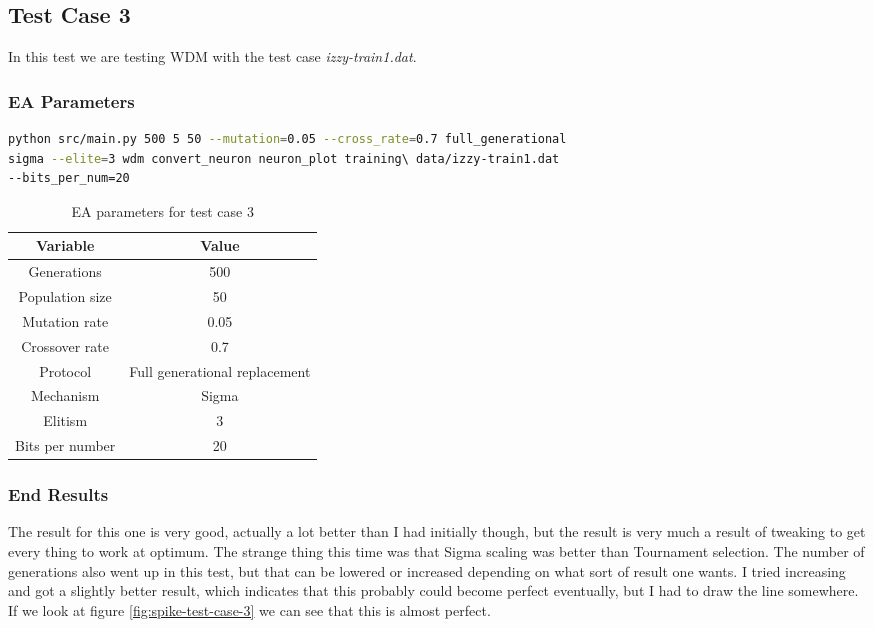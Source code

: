\subsection{Test Case 3}\label{sec:test-case-3}
In this test we are testing WDM with the test case
\textit{izzy-train1.dat}.
\subsubsection{EA Parameters}\label{sec:test-case-3-parameters}
\begin{lstlisting}[frame=single, language=bash, caption=Command-line to
replicate the results]
python src/main.py 500 5 50 --mutation=0.05 --cross_rate=0.7 full_generational
sigma --elite=3 wdm convert_neuron neuron_plot training\ data/izzy-train1.dat
--bits_per_num=20
\end{lstlisting}
\begin{table}
	\begin{tabular}{c c}
		Variable & Value \\
		\hline
		Generations & 500 \\
		\hline
		Population size & 50 \\
		\hline
		Mutation rate & 0.05 \\
		\hline
		Crossover rate & 0.7 \\
		\hline
		Protocol & Full generational replacement \\
		\hline
		Mechanism & Sigma \\
		\hline
		Elitism & 3 \\
		\hline
		Bits per number & 20 \\
	\end{tabular}
	\caption{EA parameters for test case 3}
\end{table}
\subsubsection{End Results}\label{sec:test-case-3-results}
The result for this one is very good, actually a lot better than I had initially
though, but the result is very much a result of tweaking to get every thing to
work at optimum. The strange thing this time was that Sigma scaling was better
than Tournament selection. The number of generations also went up in this test,
but that can be lowered or increased depending on what sort of result one wants.
I tried increasing and got a slightly better result, which indicates that this
probably could become perfect eventually, but I had to draw the line somewhere.
If we look at figure \ref{fig:spike-test-case-3} we can see that this is almost
perfect.

